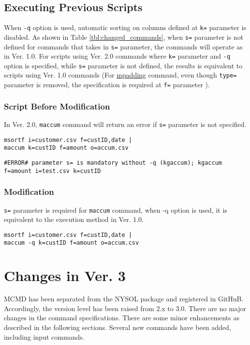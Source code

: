 \subsection{Executing Previous Scripts \label{sect:howtomodify}}

When \verb|-q| option is used, automatic sorting on columns defined at \verb|k=| parameter is disabled. As shown in Table \ref{tbl:changed_commands}, when  \verb|s=| parameter  is not defined for commands  that takes in \verb|s=| parameter, the commands will operate as in Ver. 1.0. 
For scripts  using Ver. 2.0 commands where \verb|k=| parameter and  \verb|-q| option is specified, while   \verb|s=| parameter is not defined, the results is equivalent to scripts using Ver. 1.0 commands  (For \hyperref[sect:mpadding]{mpadding} command, even though \verb|type=| parameter is removed, the specification is required at \verb|f=| parameter ). 
 
\subsubsection*{Script Before Modification}
In Ver. 2.0, \verb|maccum| command will return an error if \verb|s=| parameter is not specified. 
\begin{Verbatim}[baselinestretch=0.7,frame=single]
msortf i=customer.csv f=custID,date |
maccum k=custID f=amount o=accum.csv
\end{Verbatim}

\begin{Verbatim}[baselinestretch=0.7,frame=single]
#ERROR# parameter s= is mandatory without -q (kgaccum); kgaccum f=amount i=test.csv k=custID
\end{Verbatim}

\subsubsection*{Modification}
\verb|s=| parameter is required for \verb|maccum| command, when -q option is used, it is equivalent to the execution method in Ver. 1.0.  

\begin{Verbatim}[baselinestretch=0.7,frame=single]
msortf i=customer.csv f=custID,date |
maccum -q k=custID f=amount o=accum.csv
\end{Verbatim}

\section{Changes in Ver. 3\label{sect:changes}}
MCMD has been separated from the NYSOL package and registered in GitHuB. Accordingly, the version level has been raised from 2.x to 3.0.
There are no major changes in the command specifications. There are some minor enhancements as described in the following sections. Several new commands have been added, including input commands.

